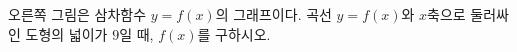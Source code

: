 \noindent\begin{minipage}[t]{0.58\linewidth}\vspace{0pt}\raggedright 오른쪽 그림은 삼차함수 $y=f(x)$의 그래프이다. 곡선 $y=f(x)$와 $x$축으로 둘러싸인 도형의 넓이가 $9$일 때, $f(x)$를 구하시오.\end{minipage}\hfill\begin{minipage}[t]{0.4\linewidth}\vspace{0pt}\centering \resizebox{\ifdim\width>\linewidth\linewidth\else\width\fi}{!}{}\end{minipage}\par
